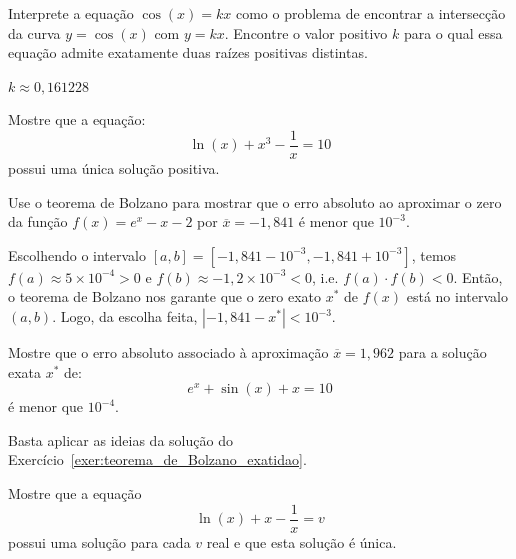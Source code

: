 \begin{Exercise} Interprete a equação $\cos(x)=kx$ como o problema de encontrar a intersecção da curva $y=\cos(x)$ com $y=kx$. Encontre o valor positivo $k$ para o qual essa equação admite exatamente duas raízes positivas distintas.
\end{Exercise}
\begin{Answer}
  \begin{tiny}
    $k\approx 0,161228$
  \end{tiny}
\end{Answer}


\begin{Exercise}Mostre que a equação:
  \begin{equation*}
    \ln(x)+x^3-\frac{1}{x}=10  
  \end{equation*}
possui uma única solução positiva.
\end{Exercise}

\begin{Exercise}\label{exer:teorema_de_Bolzano_exatidao} Use o teorema de Bolzano para mostrar que o erro absoluto ao aproximar o zero da função $f(x)=e^x-x-2$ por $\overline{x}=-1,841$ é menor que $10^{-3}$.
\end{Exercise}
\begin{Answer}
  \begin{tiny}
    Escolhendo o intervalo $[a, b] = [-1,841-10^{-3}, -1,841+10^{-3}]$, temos $f(a)\approx 5\times 10^{-4} > 0$ e $f(b)\approx -1,2\times 10^{-3} < 0$, i.e. $f(a)\cdot f(b) < 0$. Então, o teorema de Bolzano nos garante que o zero exato $x^*$ de $f(x)$ está no intervalo $(a, b)$. Logo, da escolha feita, $|-1,841 - x^*| < 10^{-3}$.
  \end{tiny}
\end{Answer}

\begin{Exercise} Mostre que o erro absoluto associado à aproximação $\overline{x} = 1,962$ para a solução exata $x^*$ de:
  \begin{equation*}
    e^x+\sin (x) +x = 10  
  \end{equation*}
é menor que $10^{-4}$.
\end{Exercise}
\begin{Answer}
  Basta aplicar as ideias da solução do Exercício~\ref{exer:teorema_de_Bolzano_exatidao}.
\end{Answer}

\begin{Exercise}\label{existe_unica} Mostre que a equação
  \begin{equation*}
    \ln(x)+x-\frac{1}{x}=v
  \end{equation*}
possui uma solução para cada $v$ real e que esta solução é única.
\end{Exercise}



